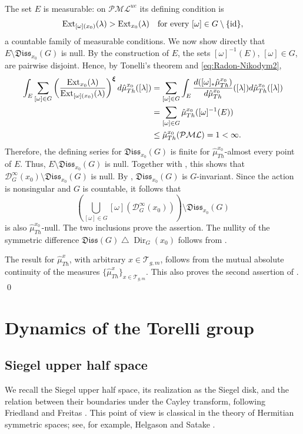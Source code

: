 \documentclass[dvipdfmx]{amsart}
\theoremstyle{remark}
\newcommand{\ext}{{\rm Ext}}
\newcommand{\teich}{\mathcal{T}}
\newcommand{\PThursM}{\hat{\mu}_{Th}}
\newcommand{\convgenus}{{\boldsymbol \xi}}
\newcommand{\pml}{\mathcal{PML}}
\newcommand{\Dirichlet}{\mathscr{D}}
\newcommand{\dissipativepart}{\mathfrak{Diss}}
\begin{document}
The set $E$ is measurable: on $\pml^{ue}$ its defining condition is
\[
\ext_{[\omega](x_0)}(\lambda)>\ext_{x_0}(\lambda)
\quad\text{for every }[\omega]\in G\setminus\{\mathrm{id}\},
\]
a countable family of measurable conditions.
We now show directly that $E\setminus\dissipativepart_{x_0}(G)$ is null.
By the construction of $E$, the sets $[\omega]^{-1}(E)$, $[\omega]\in G$, are pairwise disjoint.
Hence, by Tonelli's theorem and \eqref{eq:Radon-Nikodym2},
\begin{align*}
\int_E
\sum_{[\omega]\in G}
\left(
\frac{\ext_{x_0}(\lambda)}
{\ext_{[\omega](x_0)}(\lambda)}
\right)^{\convgenus}
d\PThursM^{x_0}([\lambda])
&=
\sum_{[\omega]\in G}
\int_E
\frac{d([\omega]_*\PThursM^{x_0})}{d\PThursM^{x_0}}([\lambda])
d\PThursM^{x_0}([\lambda])\\
&=
\sum_{[\omega]\in G}
\PThursM^{x_0}([\omega]^{-1}(E)) \\
&\le \PThursM^{x_0}(\pml)=1<\infty.
\end{align*}
Therefore, the defining series for $\dissipativepart_{x_0}(G)$ is finite for $\PThursM^{x_0}$-almost every point of $E$. 
Thus, $E\setminus\dissipativepart_{x_0}(G)$ is null. Together with , this shows that $\Dirichlet^\infty_G(x_0)\setminus\dissipativepart_{x_0}(G)$ is null. By ,
$\dissipativepart_{x_0}(G)$ is $G$-invariant.
Since the action is nonsingular and $G$ is countable, it follows that
\[
\left(
\bigcup_{[\omega]\in G}
[\omega](\Dirichlet^\infty_G(x_0))
\right)
\setminus\dissipativepart_{x_0}(G)
\]
is also $\PThursM^{x_0}$-null. The two inclusions prove the assertion.
The nullity of the symmetric difference $\dissipativepart(G)\bigtriangleup \operatorname{Dir}_G(x_0)$ follows from .

The result for $\PThursM^x$, with arbitrary
$x\in\teich_{g,m}$, follows from the mutual absolute continuity of the
measures $\{\PThursM^x\}_{x\in\teich_{g,m}}$.
This also proves the second assertion of
.
\qed

\section{Dynamics of the Torelli group}
\label{sec:dynamics_of_Torelli_group}

\subsection{Siegel upper half space}
We recall the Siegel upper half space, its realization as the Siegel disk, and the relation between their boundaries under the Cayley transform, following Friedland and Freitas \cite{FriedlandFreitas2004}.
This point of view is classical in the theory of Hermitian symmetric spaces; see, for example, Helgason \cite{Helgason2001} and Satake \cite{Satake1980}.
\end{document}
